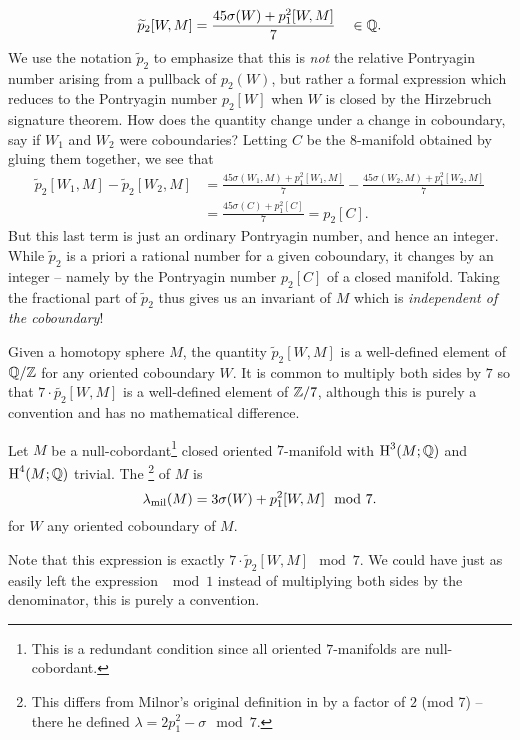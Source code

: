 \[
	\widetilde{p}_2[W, M] = \frac{45\sigma(W) + p_1^2[W, M]}{7} \quad\in\mathbb{Q}.
\]
We use the notation $\widetilde{p}_2$ to emphasize that this is \emph{not} the relative Pontryagin number arising from a pullback of $p_2(W)$, but rather a formal expression which reduces to the Pontryagin number $p_2[W]$ when $W$ is closed by the Hirzebruch signature theorem.
How does the quantity change under a change in coboundary, say if $W_1$ and $W_2$ were coboundaries? Letting $C$ be the $8$-manifold obtained by gluing them together, we see that
\[
	\begin{aligned}
		\widetilde{p}_2[W_1,M] - \widetilde{p}_2[W_2,M]
		 & = \frac{45\sigma(W_1,M) + p_1^2[W_1,M]}{7} - \frac{45\sigma(W_2, M) + p_1^2[W_2,M]}{7} \\
		 & =\frac{45\sigma(C) + p_1^2[C]}{7} = p_2[C].
	\end{aligned}
\]
But this last term is just an ordinary Pontryagin number, and hence an integer. While $\widetilde{p}_2$ is a priori a rational number for a given coboundary, it changes by an integer -- namely by the Pontryagin number $p_2[C]$ of a closed manifold.
Taking the fractional part of $\widetilde{p}_2$ thus gives us an invariant of $M$ which is \emph{independent of the coboundary}!

\begin{remark*}
	Given a homotopy sphere $M$, the quantity $\widetilde{p}_2[W,M]$ is a well-defined element of $\mathbb{Q}/\mathbb{Z}$ for any oriented coboundary $W$. It is common to multiply both sides by $7$ so that $7\cdot \widetilde{p_2}[W,M]$ is a well-defined element of $\mathbb{Z}/7$, although this is purely a convention and has no mathematical difference.
\end{remark*}

\begin{definition}\label{def:milnor-invariant-7}
	Let $M$ be a null-cobordant\footnote{This is a redundant condition since all oriented $7$-manifolds are null-cobordant.}
	closed oriented $7$-manifold with $\operatorname{H}^3(M; \mathbb{Q})$ and $\operatorname{H}^4(M; \mathbb{Q})$ trivial. The \footnote{This differs from Milnor's original definition in \cite{milnor1956manifolds} by a factor of $2$ (mod 7) -- there he defined $\lambda=2p_1^2-\sigma \mod 7$.} of $M$ is
	\[
		\lambda_{\mathrm{mil}}(M) = 3\sigma(W)+p_1^2[W,M]\mod 7.
	\]
	for $W$ any oriented coboundary of $M$.
\end{definition}

\begin{remark*}
	Note that this expression is exactly $7\cdot \widetilde{p}_2[W,M]\mod 7$. We could have just as easily left the expression $\mod 1$ instead of multiplying both sides by the denominator, this is purely a convention.
\end{remark*}

